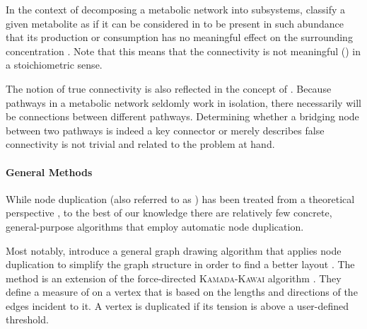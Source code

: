 \documentclass[
	fontsize=10pt, %
	twoside=true, %
	secnumdepth=1, %
  toc=indentunnumbered %
]{kaobook}
\begin{document}
In the context of decomposing a metabolic network into subsystems,
\citeauthor{schuster_exploring_2002} classify a given metabolite as
 if it can be considered in to be present in such abundance that
its production or consumption has no meaningful effect on the surrounding
concentration
\cite{schuster_exploring_2002}.
Note that this means that the connectivity is not meaningful
() in a stoichiometric sense. 

The notion of true connectivity is also reflected in the concept of  \cite{kim_IdentificationCriticalConnectors_2019}. Because pathways
in a metabolic network seldomly work in isolation, there necessarily will be
connections between different pathways. Determining whether a bridging node
between two pathways is indeed a key connector or merely describes false
connectivity is not trivial and related to the problem at hand.

\paragraph{General Methods} While node duplication (also referred to as
) has been treated from a theoretical perspective
\cite{liebers_PlanarizingGraphsSurvey_2001,abu-khzam_ClusterEditingVertex_2018},
to the best of our knowledge there are relatively few concrete, general-purpose
algorithms that employ automatic node duplication.

Most notably, \citeauthor{eades_VertexSplittingTensionfree_1996} introduce a
general graph drawing algorithm that applies node duplication to simplify the
graph structure in order to find a better layout
\cite{eades_VertexSplittingTensionfree_1996}. The method is an extension of the
force-directed \textsc{Kamada-Kawai} algorithm
\cite{kamada_AlgorithmDrawingGeneral_1989}. They define a measure of
 on a vertex that is based on the lengths and directions of the
edges incident to it. A vertex is duplicated if its tension is above a
user-defined threshold.
\end{document}
